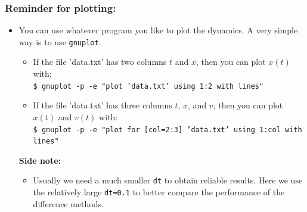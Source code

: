 \documentclass[11pt,aspectratio=169,handout]{beamer}
\begin{document}
\begin{frame}
\frametitle{Reminder for plotting:}
\begin{itemize}
	\pause
	\item You can use whatever program you like to plot the dynamics. A very simple way is to use \texttt{gnuplot}.
	\begin{itemize}
		\pause
		\item If the file 'data.txt' has two columns $t$ and $x$, then you can plot $x(t)$ with:\\
		\texttt{\$ gnuplot -p -e "plot 'data.txt' using 1:2 with lines"}
		\pause
		\item If the file 'data.txt' has three columns $t$, $x$, and $v$, then you can plot $x(t)$ and $v(t)$ with:\\
		\texttt{\$ gnuplot -p -e "plot for [col=2:3] 'data.txt' using 1:col with lines"}
	\end{itemize} \pause
	\textbf{Side note:}
	\begin{itemize}
		\item Usually we need a much smaller \texttt{dt} to obtain reliable results. Here we use the relatively large \texttt{dt=0.1} to better compare the performance of the difference methods.
	\end{itemize}
\end{itemize}

\end{frame}
\end{document}
